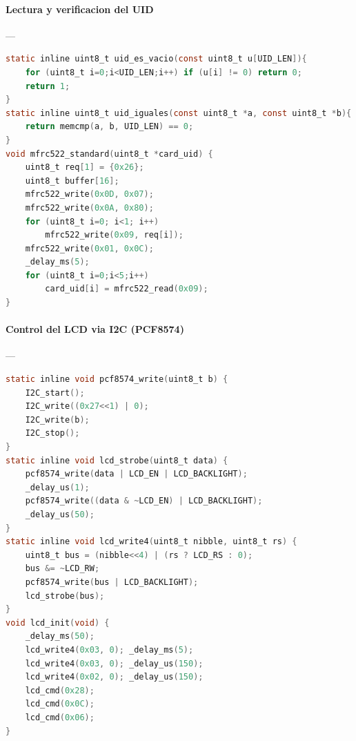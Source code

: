 \paragraph{Lectura y verificacion del UID}\label{anexo:C6_uid_check}---\\
\begin{lstlisting}[language=C, caption={Rutinas de lectura y verificacion del UID RFID.}]
static inline uint8_t uid_es_vacio(const uint8_t u[UID_LEN]){
    for (uint8_t i=0;i<UID_LEN;i++) if (u[i] != 0) return 0;
    return 1;
}
static inline uint8_t uid_iguales(const uint8_t *a, const uint8_t *b){
    return memcmp(a, b, UID_LEN) == 0;
}
void mfrc522_standard(uint8_t *card_uid) {
    uint8_t req[1] = {0x26};
    uint8_t buffer[16];
    mfrc522_write(0x0D, 0x07);
    mfrc522_write(0x0A, 0x80);
    for (uint8_t i=0; i<1; i++)
        mfrc522_write(0x09, req[i]);
    mfrc522_write(0x01, 0x0C);
    _delay_ms(5);
    for (uint8_t i=0;i<5;i++)
        card_uid[i] = mfrc522_read(0x09);
}
\end{lstlisting}

\paragraph{Control del LCD via I2C (PCF8574)}\label{anexo:C7_lcd_i2c}---\\
\begin{lstlisting}[language=C, caption={Rutinas de control de pantalla LCD mediante PCF8574.}]
static inline void pcf8574_write(uint8_t b) {
    I2C_start();
    I2C_write((0x27<<1) | 0);
    I2C_write(b);
    I2C_stop();
}
static inline void lcd_strobe(uint8_t data) {
    pcf8574_write(data | LCD_EN | LCD_BACKLIGHT);
    _delay_us(1);
    pcf8574_write((data & ~LCD_EN) | LCD_BACKLIGHT);
    _delay_us(50);
}
static inline void lcd_write4(uint8_t nibble, uint8_t rs) {
    uint8_t bus = (nibble<<4) | (rs ? LCD_RS : 0);
    bus &= ~LCD_RW;
    pcf8574_write(bus | LCD_BACKLIGHT);
    lcd_strobe(bus);
}
void lcd_init(void) {
    _delay_ms(50);
    lcd_write4(0x03, 0); _delay_ms(5);
    lcd_write4(0x03, 0); _delay_us(150);
    lcd_write4(0x02, 0); _delay_us(150);
    lcd_cmd(0x28);
    lcd_cmd(0x0C);
    lcd_cmd(0x06);
}
\end{lstlisting}

